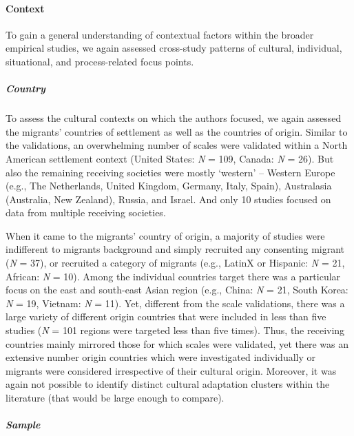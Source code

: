 

\paragraph{Context}

To gain a general understanding of contextual factors within the broader
empirical studies, we again assessed cross-study patterns of cultural,
individual, situational, and process-related focus points.

\subparagraph{Country}

To assess the cultural contexts on which the authors focused, we again
assessed the migrants' countries of settlement as well as the countries
of origin. Similar to the validations, an overwhelming number of scales
were validated within a North American settlement context (United
States: \textit{N} = 109, Canada: \textit{N} = 26). But also the
remaining receiving societies were mostly `western' -- Western Europe
(e.g., The Netherlands, United Kingdom, Germany, Italy, Spain),
Australasia (Australia, New Zealand), Russia, and Israel. And only 10
studies focused on data from multiple receiving societies.

When it came to the migrants' country of origin, a majority of studies
were indifferent to migrants background and simply recruited any
consenting migrant (\textit{N} = 37), or recruited a category of
migrants (e.g., LatinX or Hispanic: \textit{N} = 21, African: \textit{N}
= 10). Among the individual countries target there was a particular
focus on the east and south-east Asian region (e.g., China: \textit{N} =
21, South Korea: \textit{N} = 19, Vietnam: \textit{N} = 11). Yet,
different from the scale validations, there was a large variety of
different origin countries that were included in less than five studies
(\textit{N} = 101 regions were targeted less than five times). Thus, the
receiving countries mainly mirrored those for which scales were
validated, yet there was an extensive number origin countries which were
investigated individually or migrants were considered irrespective of
their cultural origin. Moreover, it was again not possible to identify
distinct cultural adaptation clusters within the literature (that would
be large enough to compare).

\subparagraph{Sample}

